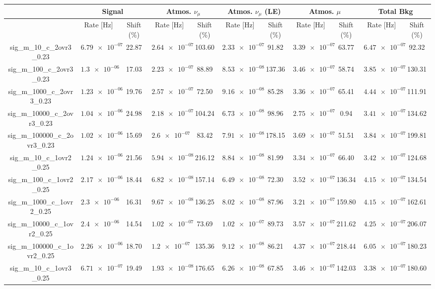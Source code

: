 \documentclass{article}%
\begin{document}
%
\scriptsize%
\noindent%
\begin{tabular}{|c||c|c|c|c|c|c|c|c|c|c|}%
\hline%
&\multicolumn{2}{|c|}{Signal}&\multicolumn{2}{|c|}{Atmos. $\nu_{\mu}$}&\multicolumn{2}{|c|}{Atmos. $\nu_{\mu}$ (LE)}&\multicolumn{2}{|c|}{Atmos. $\mu$}&\multicolumn{2}{|c|}{Total Bkg}\\%
\hline%
&Rate {[}Hz{]}&Shift (\%)&Rate {[}Hz{]}&Shift (\%)&Rate {[}Hz{]}&Shift (\%)&Rate {[}Hz{]}&Shift (\%)&Rate {[}Hz{]}&Shift (\%)\\%
\hline%
\hline%
sig\_m\_10\_c\_2ovr3\_0.23&$\num{6.79e-07}$&22.87&$\num{2.64e-07}$&103.60&$\num{2.33e-07}$&91.82&$\num{3.39e-07}$&63.77&$\num{6.47e-07}$&92.32\\%
\hline%
sig\_m\_100\_c\_2ovr3\_0.23&$\num{1.3e-06}$&17.03&$\num{2.23e-07}$&88.89&$\num{8.53e-08}$&137.36&$\num{3.46e-07}$&58.74&$\num{3.85e-07}$&130.31\\%
\hline%
sig\_m\_1000\_c\_2ovr3\_0.23&$\num{1.23e-06}$&19.76&$\num{2.57e-07}$&72.50&$\num{9.16e-08}$&85.28&$\num{3.36e-07}$&65.41&$\num{4.44e-07}$&111.91\\%
\hline%
sig\_m\_10000\_c\_2ovr3\_0.23&$\num{1.04e-06}$&24.98&$\num{2.18e-07}$&104.24&$\num{6.73e-08}$&98.96&$\num{2.75e-07}$&0.94&$\num{3.41e-07}$&134.62\\%
\hline%
sig\_m\_100000\_c\_2ovr3\_0.23&$\num{1.02e-06}$&15.69&$\num{2.6e-07}$&83.42&$\num{7.91e-08}$&178.15&$\num{3.69e-07}$&51.51&$\num{3.84e-07}$&199.81\\%
\hline%
sig\_m\_10\_c\_1ovr2\_0.25&$\num{1.24e-06}$&21.56&$\num{5.94e-08}$&216.12&$\num{8.84e-08}$&81.99&$\num{3.34e-07}$&66.40&$\num{3.42e-07}$&124.68\\%
\hline%
sig\_m\_100\_c\_1ovr2\_0.25&$\num{2.17e-06}$&18.44&$\num{6.82e-08}$&157.14&$\num{6.49e-08}$&72.30&$\num{3.52e-07}$&136.34&$\num{4.15e-07}$&134.54\\%
\hline%
sig\_m\_1000\_c\_1ovr2\_0.25&$\num{2.3e-06}$&16.31&$\num{9.67e-08}$&136.25&$\num{8.02e-08}$&87.96&$\num{3.21e-07}$&159.80&$\num{4.15e-07}$&162.61\\%
\hline%
sig\_m\_10000\_c\_1ovr2\_0.25&$\num{2.4e-06}$&14.54&$\num{1.02e-07}$&73.69&$\num{1.02e-07}$&89.73&$\num{3.57e-07}$&211.62&$\num{4.25e-07}$&206.07\\%
\hline%
sig\_m\_100000\_c\_1ovr2\_0.25&$\num{2.26e-06}$&18.70&$\num{1.2e-07}$&135.36&$\num{9.12e-08}$&86.21&$\num{4.37e-07}$&218.44&$\num{6.05e-07}$&180.23\\%
\hline%
sig\_m\_10\_c\_1ovr3\_0.25&$\num{6.71e-07}$&19.49&$\num{1.93e-08}$&176.65&$\num{6.26e-08}$&67.85&$\num{3.46e-07}$&142.03&$\num{3.38e-07}$&180.60\\%

\end{tabular}
\end{document}
